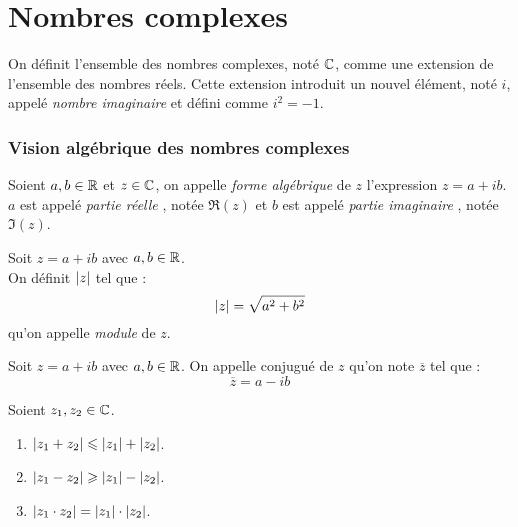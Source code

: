 \chapter{Nombres complexes}

On définit l'ensemble des nombres complexes, noté $\mathbb{C}$, comme une extension de l'ensemble des nombres réels.
Cette extension introduit un nouvel élément, noté $i$, appelé \emph{nombre imaginaire} et défini comme $i^2=-1$.

\subsection{Vision algébrique des nombres complexes}
\begin{definition}
    Soient $a, b \in \mathbb{R}$ et $z \in \mathbb{C}$, on appelle \emph{forme algébrique} de $z$ l'expression $z = a + ib$.
    \\
    $a$ est appelé \og \emph{partie réelle} \fg, notée $\Re(z)$ et $b$ est appelé \og \emph{partie imaginaire} \fg, notée $\Im(z)$.
\end{definition}

\begin{definition}
    Soit $z = a + ib$ avec $a, b \in \mathbb{R}$. 
    \\
    On définit $\abs{z}$ tel que :
    \[ \abs{z} = \sqrt{a^2 + b^2} \]
    qu'on appelle \emph{module} de $z$.
\end{definition}

\begin{definition}
    Soit $z = a + ib$ avec $a, b \in \mathbb{R}$. On appelle conjugué de $z$ qu'on note $\overline{z}$ tel que :
    \[ \overline{z} = a - ib \]
\end{definition}

\begin{proposition}
    Soient $z_1, z_2 \in \mathbb{C}$.
    \begin{multicols}{3}
        \begin{enumerate}
            \item $\abs{z_1 + z_2} \leqslant \abs{z_1} + \abs{z_2}$.
            \item $\abs{z_1 - z_2} \geqslant \abs{z_1} - \abs{z_2}$.
            \item $\abs{z_1 \cdot z_2} = \abs{z_1} \cdot \abs{z_2}$.
        \end{enumerate}
    \end{multicols}
\end{proposition}

